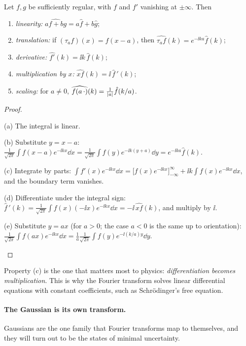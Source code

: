 \begin{proposition}\label{prop:ftprops}
  Let $f,g$ be sufficiently regular, with $f$ and $f'$ vanishing at $\pm\infty$. Then
  \begin{enumerate}
    \item[(a)] \emph{linearity:} $\widehat{af+bg}=a\hat f+b\hat g$;
    \item[(b)] \emph{translation:} if $(\tau_af)(x)=f(x-a)$, then $\widehat{\tau_af}(k)=e^{-\ii ka}\hat f(k)$;
    \item[(c)] \emph{derivative:} $\widehat{f'}(k)=\ii k\,\hat f(k)$;
    \item[(d)] \emph{multiplication by $x$:} $\widehat{xf}(k)=\ii\,\hat f\,'(k)$;
    \item[(e)] \emph{scaling:} for $a\neq0$, $\widehat{f(a\,\cdot)}(k)=\frac1{\left|a\right|}\hat f(k/a)$.
  \end{enumerate}
\end{proposition}
\begin{proof}
  \begin{steps}
    \item (a) The integral is linear.
    \item (b) Substitute $y=x-a$: $\frac1{\sqrt{2\pi}}\int f(x-a)e^{-\ii kx}\dd x=\frac1{\sqrt{2\pi}}\int f(y)e^{-\ii k(y+a)}\dd y=e^{-\ii ka}\hat f(k)$.
    \item (c) Integrate by parts: $\int f'(x)e^{-\ii kx}\dd x=\bigl[f(x)e^{-\ii kx}\bigr]_{-\infty}^\infty+\ii k\int f(x)e^{-\ii kx}\dd x$, and the boundary term vanishes.
    \item (d) Differentiate under the integral sign: $\hat f\,'(k)=\frac1{\sqrt{2\pi}}\int f(x)(-\ii x)e^{-\ii kx}\dd x=-\ii\,\widehat{xf}(k)$, and multiply by $\ii$.
    \item (e) Substitute $y=ax$ (for $a>0$; the case $a<0$ is the same up to orientation): $\frac1{\sqrt{2\pi}}\int f(ax)e^{-\ii kx}\dd x=\frac1{a}\frac1{\sqrt{2\pi}}\int f(y)e^{-\ii(k/a)y}\dd y$. \qedhere
  \end{steps}
\end{proof}

Property (c) is the one that matters most to physics: \emph{differentiation becomes multiplication}. This is why the Fourier transform solves linear differential equations with constant coefficients, such as Schr\"odinger's free equation.

\paragraph{The Gaussian is its own transform.}
Gaussians are the one family that Fourier transforms map to themselves, and they will turn out to be the states of minimal uncertainty.

